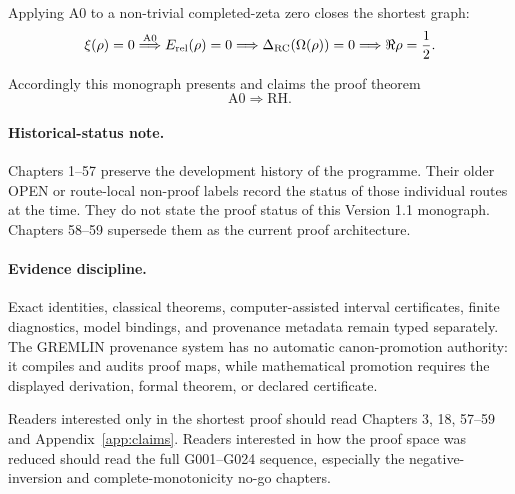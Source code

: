 Applying A0 to a non-trivial completed-zeta zero closes the shortest graph:
\[
\xi(\rho)=0
\stackrel{\mathrm{A0}}{\Longrightarrow}
E_{\rm rel}(\rho)=0
\Longrightarrow
\Delta_{\rm RC}(\Omega(\rho))=0
\Longrightarrow
\Re\rho=\frac12.
\]

Accordingly this monograph presents and claims the proof theorem
\[
\boxed{\mathrm{A0}\Longrightarrow\mathrm{RH}.}
\]

\paragraph{Historical-status note.}
Chapters 1--57 preserve the development history of the programme. Their older OPEN or route-local non-proof labels record the status of those individual routes at the time. They do not state the proof status of this Version 1.1 monograph. Chapters 58--59 supersede them as the current proof architecture.

\paragraph{Evidence discipline.}
Exact identities, classical theorems, computer-assisted interval certificates,
finite diagnostics, model bindings, and provenance metadata remain typed
separately.  The GREMLIN provenance system has no automatic canon-promotion
authority: it compiles and audits proof maps, while mathematical promotion
requires the displayed derivation, formal theorem, or declared certificate.

Readers interested only in the shortest proof should read Chapters 3, 18,
57--59 and Appendix~\ref{app:claims}.  Readers interested in how the proof
space was reduced should read the full G001--G024 sequence, especially the
negative-inversion and complete-monotonicity no-go chapters.
